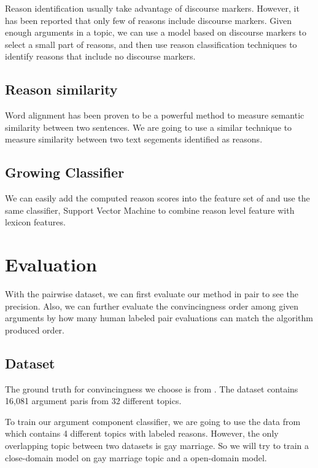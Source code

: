 \documentclass[11pt,a4paper]{article}
\begin{document}
Reason identification usually take advantage of discourse markers\cite{palau2009argumentation}. However, it has been reported that only few of reasons include discourse markers\cite{marcu2002unsupervised}. Given enough arguments in a topic, we can use a model based on discourse markers to select a small part of reasons, and then use reason classification techniques to identify reasons that include no discourse markers.

\subsection{Reason similarity}

Word alignment has been proven to be a powerful method to measure semantic similarity between two sentences\cite{sultan2015dls}. We are going to use a similar technique to measure similarity between two text segements identified as reasons.

\subsection{Growing Classifier}

We can easily add the computed reason scores into the feature set of \cite{habernal2016argument} and use the same classifier, Support Vector Machine to combine reason level feature with lexicon features. 




\section{Evaluation}
\label{sec:evaluation}

With the pairwise dataset, we can first evaluate our method in pair to see the precision. Also, we can further evaluate the convincingness order among given arguments by how many human labeled pair evaluations can match the algorithm produced order. 

\subsection{Dataset}

The ground truth for convincingness we choose is from \cite{habernal2016argument}. The dataset contains 16,081 argument paris from 32 different topics. 

To train our argument component classifier, we are going to use the data from \cite{hasan2014you} which contains 4 different topics with labeled reasons. However, the only overlapping topic between two datasets is gay marriage. So we will try to train a close-domain model on gay marriage topic and a open-domain model. 
\end{document}
